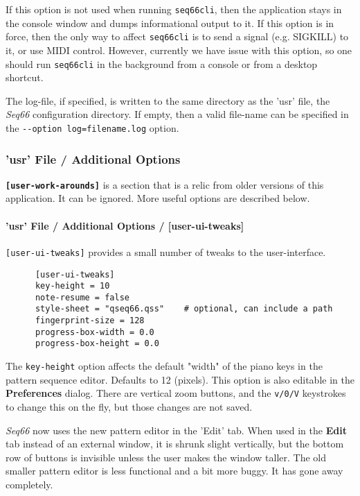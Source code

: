    If this option is not used when running \texttt{seq66cli}, then the
   application stays in the console window and dumps informational output to
   it.  If this option is in force, then the only way to affect
   \texttt{seq66cli} is to send a signal (e.g. SIGKILL) to it, or use
   MIDI control.
   However, currently we have issue with this option, so one should run
   \texttt{seq66cli} in the background from a console or from a desktop shortcut.

   The log-file, if specified, is written to the same directory as the 'usr'
   file, the \textsl{Seq66} configuration directory.
   If empty, then a valid file-name can be specified
   in the \texttt{-{}-option log=filename.log} option.

\subsubsection{'usr' File / Additional Options}
\label{subsubsec:usr_file_added_options}

   \textbf{\texttt{[user-work-arounds]}} is a section that is a relic from
   older versions of this application.  It can be ignored.  More useful options
   are described below.

\paragraph{'usr' File / Additional Options / [user-ui-tweaks]}
\label{paragraph:user_file_added_options_tweaks}

   \texttt{[user-ui-tweaks]} provides a small number of tweaks to the
   user-interface.

   \begin{verbatim}
      [user-ui-tweaks]
      key-height = 10
      note-resume = false
      style-sheet = "qseq66.qss"    # optional, can include a path
      fingerprint-size = 128
      progress-box-width = 0.0
      progress-box-height = 0.0
   \end{verbatim}

   The \texttt{key-height} option
   affects the default "width" of the piano keys in the pattern
   sequence editor.  Defaults to 12 (pixels).
   This option is also editable in the \textbf{Preferences} dialog.
   There are vertical zoom buttons, and the \texttt{v/0/V} keystrokes to change
   this on the fly, but those changes are not saved.

   \textsl{Seq66} now uses the new pattern editor in the 'Edit' tab.
   When used in the \textbf{Edit} tab instead of an external window,
   it is shrunk slight vertically, but the bottom row of buttons is invisible
   unless the user makes the window taller.
   The old smaller pattern editor is less functional and a bit more buggy.
   It has gone away completely.


